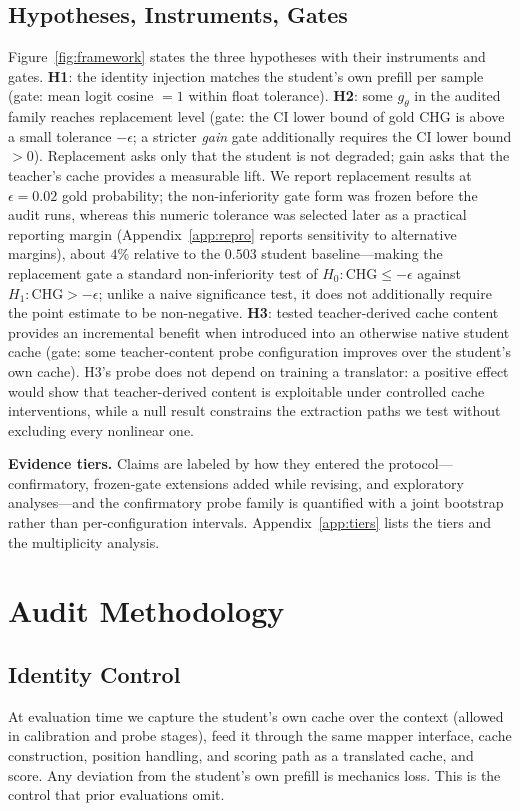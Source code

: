 \documentclass{article} %
\newcommand{\chg}{\mathrm{CHG}}
\begin{document}
\subsection{Hypotheses, Instruments, Gates}
Figure~\ref{fig:framework} states the three hypotheses with their instruments
and gates. \textbf{H1}: the identity injection matches the student's own
prefill per sample (gate: mean logit cosine $= 1$ within float tolerance).
\textbf{H2}: some $g_\theta$ in the audited family reaches replacement level
(gate: the CI lower bound of gold CHG is above a small tolerance $-\epsilon$; a
stricter \emph{gain} gate additionally requires the CI lower bound $> 0$).
Replacement asks only that the student is not degraded; gain asks that the
teacher's cache provides a measurable lift. We report replacement results at $\epsilon = 0.02$ gold probability; the non-inferiority gate form was frozen before the audit runs, whereas this numeric tolerance was selected later as a practical reporting margin (Appendix~\ref{app:repro} reports sensitivity to alternative margins), about $4\%$ relative to the $0.503$ student baseline---making the replacement gate a
standard non-inferiority test of $H_0\colon \chg \le -\epsilon$ against
$H_1\colon \chg > -\epsilon$; unlike a naive significance test, it does not
additionally require the point estimate to be non-negative. \textbf{H3}:
tested teacher-derived cache content provides an incremental benefit when
introduced into an otherwise native student cache (gate: some teacher-content
probe configuration improves over the student's own cache). H3's probe does
not depend on training
a translator: a positive effect would show that teacher-derived content is
exploitable under controlled cache interventions, while a null result
constrains the extraction paths we test without excluding every nonlinear one.

\textbf{Evidence tiers.} Claims are labeled by how they entered the protocol---
confirmatory, frozen-gate extensions added while revising, and exploratory
analyses---and the confirmatory probe family is quantified with a joint
bootstrap rather than per-configuration intervals. Appendix~\ref{app:tiers}
lists the tiers and the multiplicity analysis.

\section{Audit Methodology}
\label{sec:method}

\subsection{Identity Control}
At evaluation time we capture the student's own cache over the context
(allowed in calibration and probe stages), feed it through the same mapper
interface, cache construction, position handling, and scoring path as a
translated cache, and score. Any deviation from the student's own prefill is
mechanics loss. This is the control that prior evaluations omit.
\end{document}
